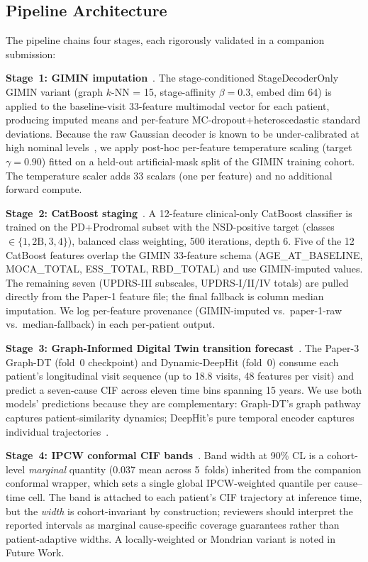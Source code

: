\subsection{Pipeline Architecture}
\label{p6:sec:arch}

The pipeline chains four stages, each rigorously validated in a companion submission:

\textbf{Stage~1: GIMIN imputation}~\cite{dupre2026paper2}. The stage-conditioned StageDecoderOnly GIMIN variant (graph $k$-NN = 15, stage-affinity $\beta = 0.3$, embed dim 64) is applied to the baseline-visit 33-feature multimodal vector for each patient, producing imputed means and per-feature MC-dropout+heteroscedastic standard deviations. Because the raw Gaussian decoder is known to be under-calibrated at high nominal levels~\cite{dupre2026paper2}, we apply post-hoc per-feature temperature scaling (target $\gamma = 0.90$) fitted on a held-out artificial-mask split of the GIMIN training cohort. The temperature scaler adds 33 scalars (one per feature) and no additional forward compute.

\textbf{Stage~2: CatBoost staging}~\cite{dupre2026paper1}. A 12-feature clinical-only CatBoost classifier is trained on the PD+Prodromal subset with the NSD-positive target (classes $\in \{1, 2\mathrm{B}, 3, 4\}$), balanced class weighting, 500 iterations, depth 6. Five of the 12 CatBoost features overlap the GIMIN 33-feature schema (AGE\_AT\_BASELINE, MOCA\_TOTAL, ESS\_TOTAL, RBD\_TOTAL) and use GIMIN-imputed values. The remaining seven (UPDRS-III subscales, UPDRS-I/II/IV totals) are pulled directly from the Paper-1 feature file; the final fallback is column median imputation. We log per-feature provenance (GIMIN-imputed vs.\ paper-1-raw vs.\ median-fallback) in each per-patient output.

\textbf{Stage~3: Graph-Informed Digital Twin transition forecast}~\cite{dupre2026paper3}. The Paper-3 Graph-DT (fold~0 checkpoint) and Dynamic-DeepHit (fold~0) consume each patient's longitudinal visit sequence (up to 18.8 visits, 48 features per visit) and predict a seven-cause CIF across eleven time bins spanning 15 years. We use both models' predictions because they are complementary: Graph-DT's graph pathway captures patient-similarity dynamics; DeepHit's pure temporal encoder captures individual trajectories~\cite{dupre2026paper3}.

\textbf{Stage~4: IPCW conformal CIF bands}~\cite{dupre2026paper3,dupre2026paper4}. Band width at 90\% CL is a cohort-level \emph{marginal} quantity (0.037 mean across 5~folds) inherited from the companion conformal wrapper, which sets a single global IPCW-weighted quantile per cause--time cell. The band is attached to each patient's CIF trajectory at inference time, but the \emph{width} is cohort-invariant by construction; reviewers should interpret the reported intervals as marginal cause-specific coverage guarantees rather than patient-adaptive widths. A locally-weighted or Mondrian variant is noted in Future Work.

